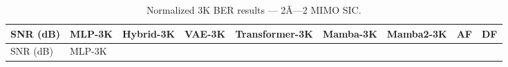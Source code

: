 \begin{longtable}[]{@{}
  >{\raggedright\arraybackslash}p{}
  >{\raggedright\arraybackslash}p{}
  >{\raggedright\arraybackslash}p{}
  >{\raggedright\arraybackslash}p{}
  >{\raggedright\arraybackslash}p{}
  >{\raggedright\arraybackslash}p{}
  >{\raggedright\arraybackslash}p{}
  >{\raggedright\arraybackslash}p{}
  >{\raggedright\arraybackslash}p{}@{}}
\caption{Normalized 3K BER results --- 2Ã—2 MIMO SIC.}\label{tbl:table12}\tabularnewline
\toprule\noalign{}
\begin{minipage}[b]{\linewidth}\raggedright
SNR (dB)
\end{minipage} & \begin{minipage}[b]{\linewidth}\raggedright
MLP-3K
\end{minipage} & \begin{minipage}[b]{\linewidth}\raggedright
Hybrid-3K
\end{minipage} & \begin{minipage}[b]{\linewidth}\raggedright
VAE-3K
\end{minipage} & \begin{minipage}[b]{\linewidth}\raggedright
Transformer-3K
\end{minipage} & \begin{minipage}[b]{\linewidth}\raggedright
Mamba-3K
\end{minipage} & \begin{minipage}[b]{\linewidth}\raggedright
Mamba2-3K
\end{minipage} & \begin{minipage}[b]{\linewidth}\raggedright
AF
\end{minipage} & \begin{minipage}[b]{\linewidth}\raggedright
DF
\end{minipage} \\
\midrule\noalign{}
\endfirsthead
\toprule\noalign{}
\begin{minipage}[b]{\linewidth}\raggedright
SNR (dB)
\end{minipage} & \begin{minipage}[b]{\linewidth}\raggedright
MLP-3K
\end{minipage} & \begin{minipage}[b]{\linewidth}\raggedright

\end{minipage}
\end{longtable}
